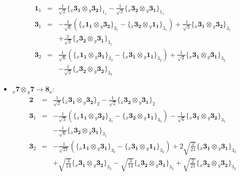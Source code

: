 \documentclass[english]{article}
\newcommand{\rep}[1]{\mathbf{#1}}
\newcommand{\repx}[2]{{}_{#2}\mathbf{#1}}
\newcommand{\subcg}[3]{\big\{ \repx{#1}{x}\otimes\repx{#2}{y}\big\}^{}_{#3}}
\begin{document}
\begin{itemize}
\begin{eqnarray*}
\rep{1}_{1} &=& \frac{1}{\sqrt{2}}\subcg{3_{1}}{3_{2}}{1_{1}}-\frac{1}{\sqrt{2}}\subcg{3_{2}}{3_{1}}{1_{1}}
\\
\rep{3}_{1} &=& -\frac{1}{\sqrt{6}}\left(\subcg{1_{1}}{3_{2}}{3_{1}}-\subcg{3_{2}}{1_{1}}{3_{1}}\right)+\frac{1}{\sqrt{3}}\subcg{3_{1}}{3_{2}}{3_{1}} \\ 
 & & +\frac{1}{\sqrt{3}}\subcg{3_{2}}{3_{1}}{3_{1}}
\\
\rep{3}_{2} &=& \frac{1}{\sqrt{6}}\left(\subcg{1_{1}}{3_{1}}{3_{2}}-\subcg{3_{1}}{1_{1}}{3_{2}}\right)+\frac{1}{\sqrt{3}}\subcg{3_{1}}{3_{1}}{3_{2}} \\ 
 & & -\frac{1}{\sqrt{3}}\subcg{3_{2}}{3_{2}}{3_{2}}
\end{eqnarray*}
\item $\repx{7}{x}\otimes\repx{7}{y}\to\rep{8}_{a}$:
\begin{eqnarray*}
\rep{2} &=& \frac{1}{\sqrt{2}}\subcg{3_{1}}{3_{2}}{2}-\frac{1}{\sqrt{2}}\subcg{3_{2}}{3_{1}}{2}
\\
\rep{3}_{1} &=& -\frac{1}{\sqrt{3}}\left(\subcg{1_{1}}{3_{2}}{3_{1}}-\subcg{3_{2}}{1_{1}}{3_{1}}\right)-\frac{1}{\sqrt{6}}\subcg{3_{1}}{3_{2}}{3_{1}} \\ 
 & & -\frac{1}{\sqrt{6}}\subcg{3_{2}}{3_{1}}{3_{1}}
\\
\rep{3}_{2} &=& -\frac{1}{\sqrt{21}}\left(\subcg{1_{1}}{3_{1}}{3_{2}}-\subcg{3_{1}}{1_{1}}{3_{2}}\right)+2 \sqrt{\frac{2}{21}}\subcg{3_{1}}{3_{1}}{3_{2}} \\ 
 & & +\sqrt{\frac{3}{14}}\subcg{3_{1}}{3_{2}}{3_{2}}-\sqrt{\frac{3}{14}}\subcg{3_{2}}{3_{1}}{3_{2}}+\sqrt{\frac{2}{21}}\subcg{3_{2}}{3_{2}}{3_{2}}
\end{eqnarray*}
\end{itemize}
\end{document}

